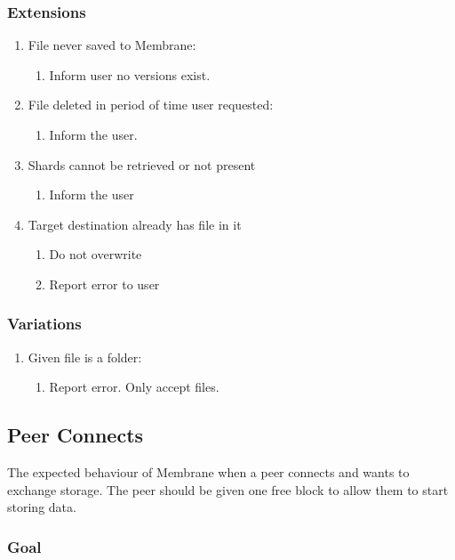 \documentclass[11pt, a4paper, twoside]{report}
\begin{document}
\subsubsection{Extensions}
\begin{enumerate}
  \item File never saved to Membrane:
	\begin{enumerate}
	  \item Inform user no versions exist.
	\end{enumerate}
  \item File deleted in period of time user requested:
	\begin{enumerate}
	  \item Inform the user.
	\end{enumerate}
  \item Shards cannot be retrieved or not present
	\begin{enumerate}
	  \item Inform the user
	\end{enumerate}
  \item Target destination already has file in it
	\begin{enumerate}
	  \item Do not overwrite
	  \item Report error to user
	\end{enumerate}
\end{enumerate}

\subsubsection{Variations}
\begin{enumerate}
  \item Given file is a folder:
	\begin{enumerate}
	  \item Report error. Only accept files.
	\end{enumerate}
\end{enumerate}

\subsection{Peer Connects}

The expected behaviour of Membrane when a peer connects and wants to exchange storage. The peer should be given one free block to allow them to start storing data.

\subsubsection{Goal}
\end{document}
